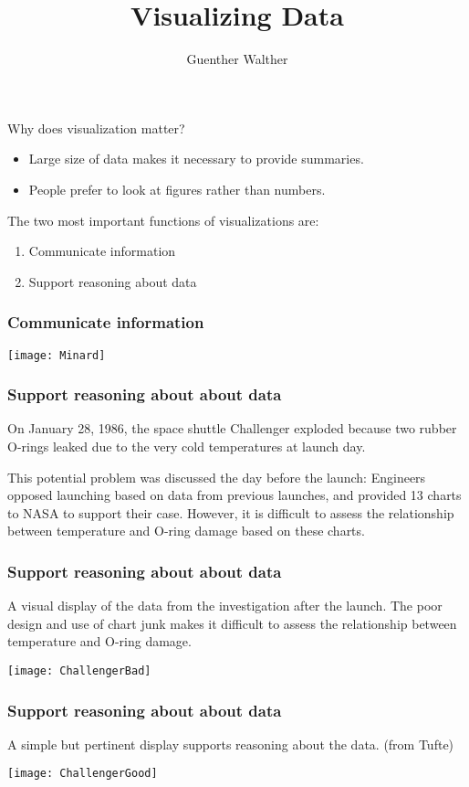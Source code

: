 \documentclass{beamer}
\title{Visualizing Data }
\author{Guenther Walther}
\begin{document}
\frame{\titlepage}

\begin{frame}
Why does visualization matter?\\
\begin{itemize}
\item Large size of data makes it necessary to provide summaries.
\item People prefer to look at figures rather than numbers.
\end{itemize}
\bigskip

The two most important functions of visualizations are:\\
\begin{enumerate}
\item Communicate information
\item Support reasoning about data
\end{enumerate}
\end{frame}

\begin{frame}
\frametitle{Communicate information}
\texttt{[image: Minard]}
\end{frame}

\begin{frame}
\frametitle{Support reasoning about about data}
On January 28, 1986, the space shuttle Challenger exploded
because two rubber O-rings leaked due to the very cold temperatures
at launch day. 
\medskip

This potential problem was discussed the day before the launch:
Engineers opposed launching based on data from previous launches, 
and provided 13 charts to NASA
to support their case. However, it is difficult to assess
the relationship between temperature and O-ring damage based on these
charts.
\end{frame}

\begin{frame}
\frametitle{Support reasoning about about data}
A visual display of the data from the investigation after the launch.
The poor design and use of chart junk makes it difficult to assess the
relationship between temperature and O-ring damage.

\texttt{[image: ChallengerBad]}
\end{frame}

\begin{frame}
\frametitle{Support reasoning about about data}
A simple but pertinent display supports reasoning about the data. (from Tufte)
\medskip

\texttt{[image: ChallengerGood]}
\end{frame}
\end{document}
